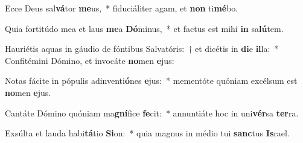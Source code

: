 \item Ecce Deus sal\textbf{vá}tor \textbf{me}us,~* fiduciáliter agam, et \textbf{non} ti\textbf{mé}bo.
\item Quia fortitúdo mea et laus \textbf{me}a \textbf{Dó}minus,~* et factus est mihi \textbf{in} sa\textbf{lú}tem.
\item Hauriétis aquas in gáudio de fóntibus Salvatóris:~† et dicétis in \textbf{di}e \textbf{il}la:~* Confitémini Dómino, et invocáte \textbf{no}men \textbf{e}jus:
\item Notas fácite in pópulis adinventi\textbf{ó}nes \textbf{e}jus:~* mementóte quóniam excélsum est \textbf{no}men \textbf{e}jus.
\item Cantáte Dómino quóniam ma\textbf{gní}fice \textbf{fe}cit:~* annuntiáte hoc in uni\textbf{vér}sa \textbf{ter}ra.
\item Exsúlta et lauda habi\textbf{tá}tio \textbf{Si}on:~* quia magnus in médio tui \textbf{sanc}tus \textbf{Is}rael.
